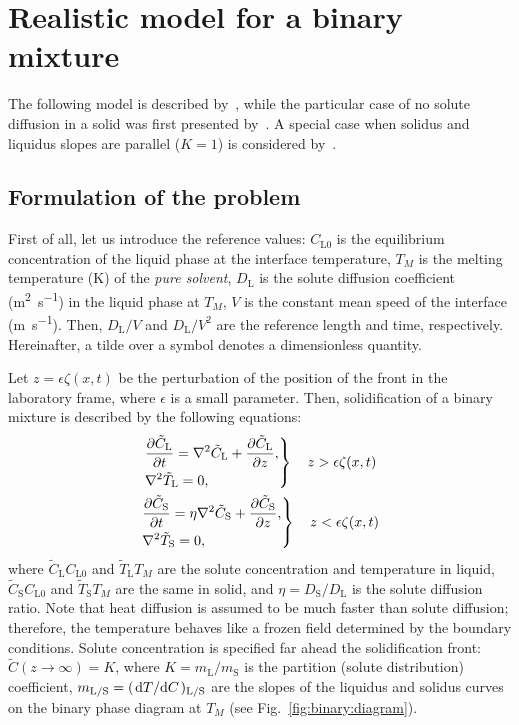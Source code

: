 \documentclass{article}
\newcommand{\liq}{\text{L}}
\newcommand{\sol}{\text{S}}
\begin{document}
\section{Realistic model for a binary mixture}

The following model is described by~\textcite{caroli1982emergence},
while the particular case of no solute diffusion in a solid was first presented by~\textcite{wollkind1970nonlinear}.
A special case when solidus and liquidus slopes are parallel ($K=1$) is considered by~\textcite{langer1977studies}.

\subsection{Formulation of the problem}

First of all, let us introduce the reference values:
$C_{\liq0}$ is the equilibrium concentration of the liquid phase at the interface temperature,
$T_M$ is the melting temperature (\si{\K}) of the \emph{pure solvent},
$D_\liq$ is the solute diffusion coefficient (\si{\m\squared\per\s}) in the liquid phase at $T_M$,
$V$ is the constant mean speed of the interface (\si{\m\per\s}).
Then, $D_\liq/V$ and $D_\liq/V^2$ are the reference length and time, respectively.
Hereinafter, a tilde over a symbol denotes a dimensionless quantity.

Let $z = \epsilon\zeta(x,t)$ be the perturbation of the position of the front in the laboratory frame,
where $\epsilon$ is a small parameter.
Then, solidification of a binary mixture is described by the following equations:
\begin{gather}
    \left.\begin{aligned}
        &\pdv{\tilde{C}_\liq}{t} = \nabla^2 \tilde{C}_\liq + \pdv{\tilde{C}_\liq}{z}, \\
        &\nabla^2 \tilde{T}_\liq = 0,
    \end{aligned}\right\} \quad z > \epsilon\zeta(x,t) \label{eq:governingL}\\
    \left.\begin{aligned}
        &\pdv{\tilde{C}_\sol}{t} = \eta\nabla^2 \tilde{C}_\sol + \pdv{\tilde{C}_\sol}{z}, \\
        &\nabla^2 \tilde{T}_\sol = 0,
    \end{aligned}\right\} \quad z < \epsilon\zeta(x,t) \label{eq:governingS}
\end{gather}
where $\tilde{C}_\liq C_{\liq0}$ and $\tilde{T}_\liq T_M$ are the solute concentration and temperature in liquid,
$\tilde{C}_\sol C_{\liq0}$ and $\tilde{T}_\sol T_M$ are the same in solid,
and $\eta = D_\sol/D_\liq$ is the solute diffusion ratio.
Note that heat diffusion is assumed to be much faster than solute diffusion;
therefore, the temperature behaves like a frozen field determined by the boundary conditions.
Solute concentration is specified far ahead the solidification front: $\tilde{C}(z\to\infty) = K$,
where $K = m_\liq/m_\sol$ is the partition (solute distribution) coefficient,
$m_{\liq/\sol} = (\dv*{T}{C})_{\liq/\sol}$ are the slopes of the liquidus and solidus curves
on the binary phase diagram at $T_M$ (see Fig.~\ref{fig:binary:diagram}).
\end{document}

